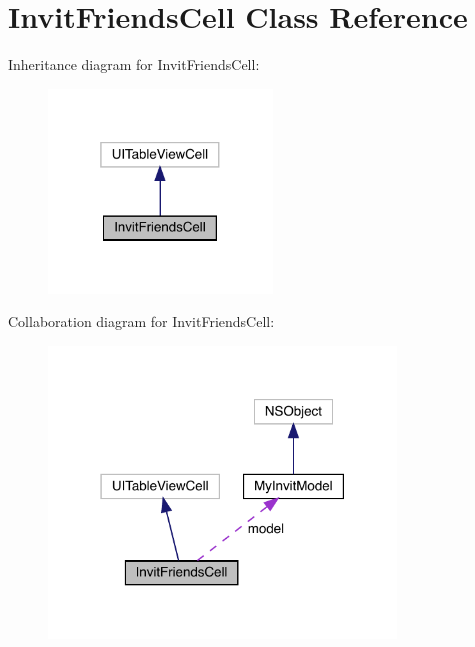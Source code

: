\hypertarget{interface_invit_friends_cell}{}\section{Invit\+Friends\+Cell Class Reference}
\label{interface_invit_friends_cell}


Inheritance diagram for Invit\+Friends\+Cell\+:\nopagebreak
\begin{figure}[H]
\begin{center}
\leavevmode
\includegraphics[width=169pt]{interface_invit_friends_cell__inherit__graph}
\end{center}
\end{figure}


Collaboration diagram for Invit\+Friends\+Cell\+:\nopagebreak
\begin{figure}[H]
\begin{center}
\leavevmode
\includegraphics[width=262pt]{interface_invit_friends_cell__coll__graph}
\end{center}
\end{figure}
